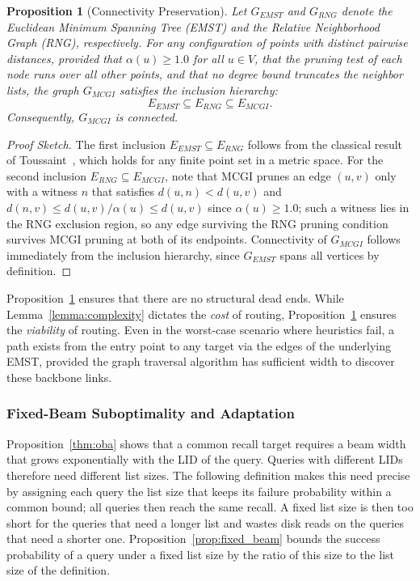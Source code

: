 \documentclass{article}
\theoremstyle{plain}
\newtheorem{proposition}[theorem]{Proposition}
\theoremstyle{definition}
\theoremstyle{remark}
\begin{document}
\begin{proposition}[Connectivity Preservation]
\label{prop:connectivity}
Let $G_{EMST}$ and $G_{RNG}$ denote the Euclidean Minimum Spanning Tree (EMST) and the Relative Neighborhood Graph (RNG), respectively. For any configuration of points with distinct pairwise distances, provided that $\alpha(u) \ge 1.0$ for all $u \in V$, that the pruning test of each node runs over all other points, and that no degree bound truncates the neighbor lists, the graph $G_{MCGI}$ satisfies the inclusion hierarchy:
\begin{equation}
    E_{EMST} \subseteq E_{RNG} \subseteq E_{MCGI}.
\end{equation}
Consequently, $G_{MCGI}$ is connected.
\end{proposition}

\begin{proof}[Proof Sketch]
The first inclusion $E_{EMST} \subseteq E_{RNG}$ follows from the classical result of Toussaint~\cite{TOUSSAINT1980261}, which holds for any finite point set in a metric space.
For the second inclusion $E_{RNG} \subseteq E_{MCGI}$, note that MCGI prunes an edge $(u,v)$ only with a witness $n$ that satisfies $d(u,n) < d(u,v)$ and $d(n,v) \le d(u,v)/\alpha(u) \le d(u,v)$ since $\alpha(u) \geq 1.0$; such a witness lies in the RNG exclusion region, so any edge surviving the RNG pruning condition survives MCGI pruning at both of its endpoints.
Connectivity of $G_{MCGI}$ follows immediately from the inclusion hierarchy, since $G_{EMST}$ spans all vertices by definition.
\end{proof}

Proposition~\ref{prop:connectivity} ensures that there are no structural dead ends. While Lemma~\ref{lemma:complexity} dictates the \textit{cost} of routing, Proposition~\ref{prop:connectivity} ensures the \textit{viability} of routing. Even in the worst-case scenario where heuristics fail, a path exists from the entry point to any target via the edges of the underlying EMST, provided the graph traversal algorithm has sufficient width to discover these backbone links.

\subsubsection{Fixed-Beam Suboptimality and Adaptation}
\label{subsec:optimality}

Proposition~\ref{thm:oba} shows that a common recall target requires a beam width that grows exponentially with the LID of the query. Queries with different LIDs therefore need different list sizes. The following definition makes this need precise by assigning each query the list size that keeps its failure probability within a common bound; all queries then reach the same recall. A fixed list size is then too short for the queries that need a longer list and wastes disk reads on the queries that need a shorter one. Proposition~\ref{prop:fixed_beam} bounds the success probability of a query under a fixed list size by the ratio of this size to the list size of the definition.
\end{document}
